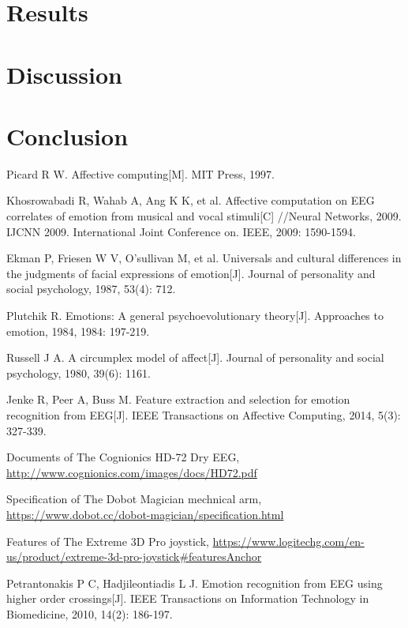 \documentclass[runningheads,a4paper]{llncs}
\begin{document}
\section{Results}

\section{Discussion}

\section{Conclusion}



\begin{thebibliography}{4}

 Picard R W.
  Affective computing[M].
   MIT Press, 1997.

 Khosrowabadi R, Wahab A, Ang K K, et al.
Affective computation on EEG correlates of emotion from musical and vocal stimuli[C]
//Neural Networks, 2009. IJCNN 2009. International Joint Conference on. IEEE, 2009: 1590-1594.

 Ekman P, Friesen W V, O'sullivan M, et al.
Universals and cultural differences in the judgments of facial expressions of emotion[J].
Journal of personality and social psychology, 1987, 53(4): 712.

 Plutchik R.
Emotions: A general psychoevolutionary theory[J].
Approaches to emotion, 1984, 1984: 197-219.

 Russell J A.
A circumplex model of affect[J].
Journal of personality and social psychology, 1980, 39(6): 1161.

 Jenke R, Peer A, Buss M.
Feature extraction and selection for emotion recognition from EEG[J].
IEEE Transactions on Affective Computing, 2014, 5(3): 327-339.

 Documents of The Cognionics HD-72 Dry EEG,
\url{http://www.cognionics.com/images/docs/HD72.pdf}

 Specification of The Dobot Magician mechnical arm,
\url{https://www.dobot.cc/dobot-magician/specification.html}

 Features of The Extreme 3D Pro joystick,
\url{https://www.logitechg.com/en-us/product/extreme-3d-pro-joystick#featuresAnchor}

 Petrantonakis P C, Hadjileontiadis L J.
Emotion recognition from EEG using higher order crossings[J].
IEEE Transactions on Information Technology in Biomedicine, 2010, 14(2): 186-197.


\end{thebibliography}
\end{document}
